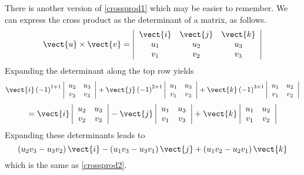 There is another version of \ref{crossprod1} which may be easier to remember.
We can express the cross product as the determinant of a matrix, as follows. 
\begin{equation}
\vect{u}\times \vect{v} = \left\vert
\begin{array}{ccc}
\vect{i} & \vect{j} & \vect{k} \\
u_{1} & u_{2} & u_{3} \\
v_{1} & v_{2} & v_{3}
\end{array}
\right\vert  \label{crossprod3}
\end{equation}
Expanding the determinant along the top row yields
\begin{equation*}
\vect{i}\left( -1\right) ^{1+1}\left\vert
\begin{array}{cc}
u_{2} & u_{3} \\
v_{2} & v_{3}
\end{array}
\right\vert +\vect{j}\left( -1\right) ^{2+1}\left\vert
\begin{array}{cc}
u_{1} & u_{3} \\
v_{1} & v_{3}
\end{array}
\right\vert +\vect{k}\left( -1\right) ^{3+1}\left\vert
\begin{array}{cc}
u_{1} & u_{2} \\
v_{1} & v_{2}
\end{array}
\right\vert
\end{equation*}
\begin{equation*}
=\vect{i}\left\vert
\begin{array}{cc}
u_{2} & u_{3} \\
v_{2} & v_{3}
\end{array}
\right\vert -\vect{j}\left\vert
\begin{array}{cc}
u_{1} & u_{3} \\
v_{1} & v_{3}
\end{array}
\right\vert +\vect{k}\left\vert
\begin{array}{cc}
u_{1} & u_{2} \\
v_{1} & v_{2}
\end{array}
\right\vert
\end{equation*}
Expanding these determinants leads to 
\begin{equation*}
\left( u_{2}v_{3}-u_{3}v_{2}\right) \vect{i}-\left(
u_{1}v_{3}-u_{3}v_{1}\right) \vect{j}+\left( u_{1}v_{2}-u_{2}v_{1}\right)
\vect{k}  
\end{equation*}
which is the same as \ref{crossprod2}.

